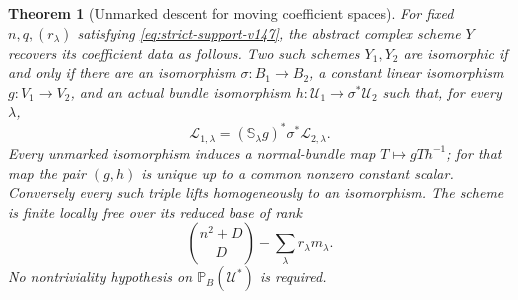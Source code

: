 \documentclass[11pt,reqno]{amsart}
\numberwithin{equation}{section}
\newtheorem{theorem}{Theorem}[section]
\theoremstyle{definition}\newtheorem{definition}[theorem]{Definition}
\theoremstyle{remark}\newtheorem{remark}[theorem]{Remark}
\newcommand{\Pj}{\mathbb P}\newcommand{\A}{\mathbb A}
\begin{document}
\begin{theorem}[Unmarked descent for moving coefficient spaces]
\label{thm:general-moving-coefficients-v147}
For fixed \(n,q,(r_\lambda)\) satisfying
\eqref{eq:strict-support-v147}, the abstract complex scheme \(Y\)
recovers its coefficient data as follows.  Two such schemes \(Y_1,Y_2\)
are isomorphic if and only if there are an isomorphism
\(\sigma:B_1\to B_2\), a constant linear isomorphism
\(g:V_1\to V_2\), and an actual bundle isomorphism
\(h:\mathcal U_1\to\sigma^*\mathcal U_2\) such that, for every
\(\lambda\),
\begin{equation}\label{eq:coefficient-equivalence-v147}
 \mathcal L_{1,\lambda}=
       (\mathbb S_\lambda g)^*\sigma^*\mathcal L_{2,\lambda}.
\end{equation}
Every unmarked isomorphism induces a normal-bundle map
\(T\mapsto gTh^{-1}\); for that map the pair \((g,h)\) is
unique up to a common nonzero constant scalar.  Conversely every
such triple lifts homogeneously to an isomorphism.  The scheme is
finite locally free over its reduced base of rank
\[
             \binom{n^2+D}{D}-\sum_\lambda r_\lambda m_\lambda.
\]
No nontriviality hypothesis on \(\Pj_B(\mathcal U^*)\) is required.
\end{theorem}
\end{document}

